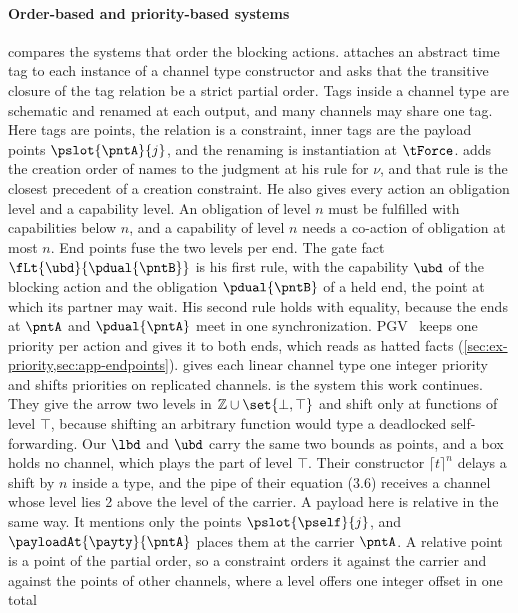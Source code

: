 \paragraph{Order-based and priority-based systems}
 compares the systems that order the blocking actions.
\citet{Kobayashi97} attaches an abstract time tag to each instance of a
channel type constructor and asks that the transitive closure of the tag
relation be a strict partial order. Tags inside a channel type are
schematic and renamed at each output, and many channels may share one
tag. Here tags are points, the relation is a constraint, inner tags are
the payload points $\pslot{\pntA}{j}$, and the renaming is instantiation
at $\tForce$.
\citet{Kobayashi06} adds the creation order of names to the judgment at
his rule for $\nu$, and that rule is the closest precedent of a creation
constraint. He also gives every action an obligation level and a
capability level. An obligation of level $n$ must be fulfilled with
capabilities below $n$, and a capability of level $n$ needs a co-action
of obligation at most $n$. End points fuse the two levels per end. The
gate fact $\fLt{\ubd}{\pdual{\pntB}}$ is his first rule, with the
capability $\ubd$ of the blocking action and the obligation
$\pdual{\pntB}$ of a held end, the point at which its partner may wait.
His second rule holds with equality, because the ends at $\pntA$ and
$\pdual{\pntA}$ meet in one synchronization. PGV~\cite{KokkeD23} keeps
one priority per action and gives it to both ends, which reads as
hatted facts (\cref{sec:ex-priority,sec:app-endpoints}).
\citet{Padovani14} gives each linear channel type one integer priority
and shifts priorities on replicated channels.
\citet{PadovaniN15} is the system this work continues. They give the
arrow two levels in $\mathbb{Z} \cup \set{\bot, \top}$ and shift only at
functions of level $\top$, because shifting an arbitrary function would
type a deadlocked self-forwarding. Our $\lbd$ and $\ubd$ carry the same
two bounds as points, and a box holds no channel, which plays the part
of level $\top$. Their constructor $\lceil t \rceil^n$ delays a shift by
$n$ inside a type, and the pipe of their equation (3.6) receives a
channel whose level lies 2 above the level of the carrier. A payload
here is relative in the same way. It mentions only the points
$\pslot{\pself}{j}$, and $\payloadAt{\payty}{\pntA}$ places them at the
carrier $\pntA$. A relative point is a point of the partial order, so a
constraint orders it against the carrier and against the points of
other channels, where a level offers one integer offset in one total
